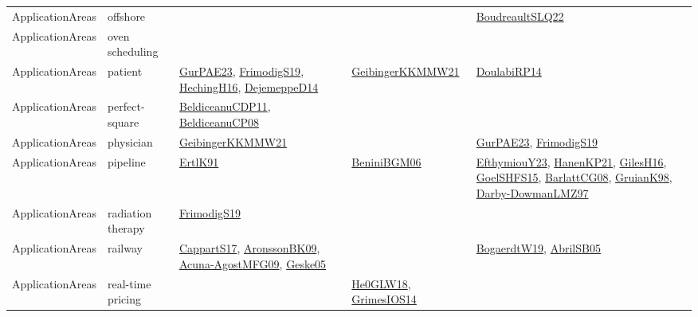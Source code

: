 {\begin{longtable}{lp{3cm}>{\raggedright}p{6cm}>{\raggedright}p{6cm}p{8cm}}
ApplicationAreas & offshore &  &  & \href{papers/BoudreaultSLQ22.pdf}{BoudreaultSLQ22}\cite{BoudreaultSLQ22}\\
ApplicationAreas & oven scheduling &  &  & \\
ApplicationAreas & patient & \href{articles/GurPAE23.pdf}{GurPAE23}\cite{GurPAE23}, \href{papers/FrimodigS19.pdf}{FrimodigS19}\cite{FrimodigS19}, \href{papers/HechingH16.pdf}{HechingH16}\cite{HechingH16}, \href{papers/DejemeppeD14.pdf}{DejemeppeD14}\cite{DejemeppeD14} & \href{papers/GeibingerKKMMW21.pdf}{GeibingerKKMMW21}\cite{GeibingerKKMMW21} & \href{papers/DoulabiRP14.pdf}{DoulabiRP14}\cite{DoulabiRP14}\\
ApplicationAreas & perfect-square & \href{articles/BeldiceanuCDP11.pdf}{BeldiceanuCDP11}\cite{BeldiceanuCDP11}, \href{papers/BeldiceanuCP08.pdf}{BeldiceanuCP08}\cite{BeldiceanuCP08} &  & \\
ApplicationAreas & physician & \href{papers/GeibingerKKMMW21.pdf}{GeibingerKKMMW21}\cite{GeibingerKKMMW21} &  & \href{articles/GurPAE23.pdf}{GurPAE23}\cite{GurPAE23}, \href{papers/FrimodigS19.pdf}{FrimodigS19}\cite{FrimodigS19}\\
ApplicationAreas & pipeline & \href{papers/ErtlK91.pdf}{ErtlK91}\cite{ErtlK91} & \href{papers/BeniniBGM06.pdf}{BeniniBGM06}\cite{BeniniBGM06} & \href{papers/EfthymiouY23.pdf}{EfthymiouY23}\cite{EfthymiouY23}, \href{papers/HanenKP21.pdf}{HanenKP21}\cite{HanenKP21}, \href{papers/GilesH16.pdf}{GilesH16}\cite{GilesH16}, \href{articles/GoelSHFS15.pdf}{GoelSHFS15}\cite{GoelSHFS15}, \href{papers/BarlattCG08.pdf}{BarlattCG08}\cite{BarlattCG08}, \href{papers/GruianK98.pdf}{GruianK98}\cite{GruianK98}, \href{articles/Darby-DowmanLMZ97.pdf}{Darby-DowmanLMZ97}\cite{Darby-DowmanLMZ97}\\
ApplicationAreas & radiation therapy & \href{papers/FrimodigS19.pdf}{FrimodigS19}\cite{FrimodigS19} &  & \\
ApplicationAreas & railway & \href{papers/CappartS17.pdf}{CappartS17}\cite{CappartS17}, \href{papers/AronssonBK09.pdf}{AronssonBK09}\cite{AronssonBK09}, \href{papers/Acuna-AgostMFG09.pdf}{Acuna-AgostMFG09}\cite{Acuna-AgostMFG09}, \href{papers/Geske05.pdf}{Geske05}\cite{Geske05} &  & \href{papers/BogaerdtW19.pdf}{BogaerdtW19}\cite{BogaerdtW19}, \href{papers/AbrilSB05.pdf}{AbrilSB05}\cite{AbrilSB05}\\
ApplicationAreas & real-time pricing &  & \href{papers/He0GLW18.pdf}{He0GLW18}\cite{He0GLW18}, \href{articles/GrimesIOS14.pdf}{GrimesIOS14}\cite{GrimesIOS14} & \\

\end{longtable}}
